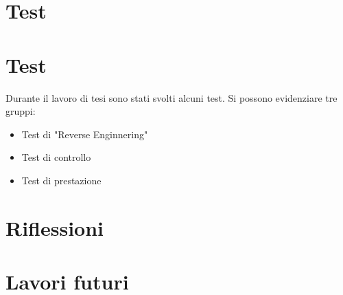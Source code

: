 \section{Test}
\section{Test}
Durante il lavoro di tesi sono stati svolti alcuni test. 
Si possono evidenziare tre gruppi:
\begin{itemize}
    \item Test di "Reverse Enginnering"
    \item Test di controllo 
    \item Test di prestazione
\end{itemize}
\section{Riflessioni}
\section{Lavori futuri}